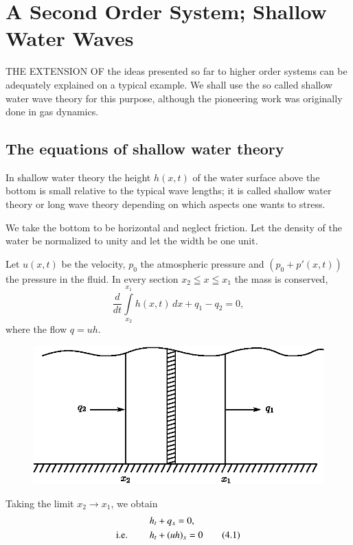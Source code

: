 
\chapter{A Second Order System; Shallow Water Waves}\pageoriginale\label{chap4}  

THE EXTENSION OF the ideas presented so far to higher order systems can be adequately explained on a typical example. We shall use the so called shallow water wave theory for this purpose, although the pioneering work was originally done in gas dynamics.

\section{The equations of shallow water theory}\label{chap4:sec4.1}

In shallow water theory the height $h(x,t)$ of the water surface above the bottom is small relative to the typical wave lengths; it is called shallow water theory or long wave theory depending on which aspects one wants to stress.

We take the bottom to be horizontal and neglect friction. Let the density of the water be normalized to unity and let the width be one unit.

Let $u(x,t)$ be the velocity, $p_0$ the atmospheric pressure and $(p_0+p'(x,t))$ the pressure in the fluid. In every section $x_2\leqq x\leqq x_1$ the mass is conserved, \ie
$$
\frac{d}{dt}\int\limits_{x_2}^{x_1}h(x,t)\,dx +q_1-q_2=0,
$$
where the flow $q=uh$.
\begin{figure}[H]
\centering
\includegraphics{figures/fig61-4.1.eps}
\caption{}
\label{chap1:fig4.1}
\end{figure}\pageoriginale

Taking the limit $x_2\to x_1$, we obtain 
\begin{align}
h_t & + q_x=0,\notag\\
\text{{i.e.}\kern.3em} \qquad h_t & + (uh)_x=0\tag{4.1}\label{chap4:eq4.1}
\end{align}

